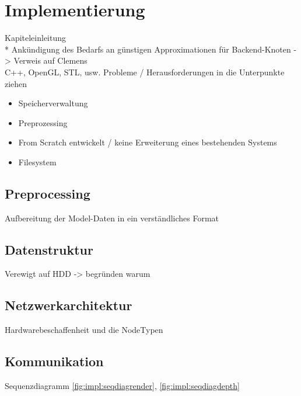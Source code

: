 
\chapter{Implementierung}
\label{chap:impl}
Kapiteleinleitung\\*
Ankündigung des Bedarfs an günstigen Approximationen für Backend-Knoten -> Verweis auf Clemens\\
C++, OpenGL, STL, usw.
Probleme / Herausforderungen in die Unterpunkte ziehen
\begin{itemize}
 \item Speicherverwaltung
 \item Preprozessing
 \item From Scratch entwickelt / keine Erweiterung eines bestehenden Systems
 \item Filesystem
\end{itemize}

\section{Preprocessing}
\label{sec:impl:preprocessing}
Aufbereitung der Model-Daten in ein verständliches Format

\section{Datenstruktur}
\label{sec:impl:datenstruktur}
Verewigt auf HDD -> begründen warum

\section{Netzwerkarchitektur}
\label{sec:impl:netzwerkarchitektur}
Hardwarebeschaffenheit und die NodeTypen

\section{Kommunikation}
\label{sec:impl:kommunikation}
Sequenzdiagramm \ref{fig:impl:seqdiagrender}, \ref{fig:impl:seqdiagdepth}


